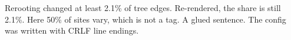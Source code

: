 \documentclass{article}
\begin{document}
Rerooting changed at least 2.1\% of tree edges. %
Re-rendered, the share is still 2.1\%. %
Here 50\% of sites vary, which is not a tag.
A glued sentence.%
The config was written with CRLF line endings. %

\end{document}
